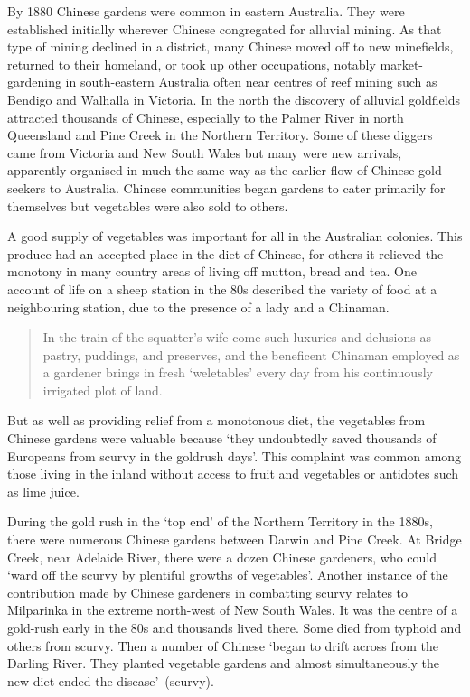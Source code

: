By 1880 Chinese gardens were common in eastern Australia.  They were
established initially wherever Chinese congregated for alluvial
mining.  As that type of mining declined in a
district, many Chinese moved off to new minefields, returned to their
homeland, or took up other occupations, notably market-gardening in
south-eastern Australia often near centres of reef mining
 such as Bendigo  and Walhalla
 in Victoria.  In the north the discovery of alluvial
goldfields attracted thousands of Chinese, especially to the Palmer
River in
 north
Queensland  and Pine Creek  in the
Northern Territory.   Some of these diggers
came from Victoria and New South Wales but many were new arrivals,
apparently organised in much the same way as the earlier flow of
Chinese gold-seekers to Australia.  Chinese communities began gardens
to cater primarily for themselves but vegetables were also sold to
others.

A good supply of vegetables was important for all in the Australian
colonies.  This produce had an accepted place in the diet of Chinese,
for others it relieved the monotony in many country areas of living
off mutton, bread and tea.  One account of life on a sheep station in
the 80s described the variety of food at a neighbouring station, due
to the presence of a lady and a Chinaman.
\begin{quote}
	In the train of the squatter's wife come such luxuries and
	delusions as pastry, puddings, and preserves, and the
	beneficent Chinaman employed as a gardener brings in fresh
	`weletables' every day from his continuously irrigated plot of
	land.
\end{quote}
But as well as providing relief from a monotonous diet, the vegetables
from Chinese gardens were valuable because `they undoubtedly saved
thousands of Europeans from scurvy in the goldrush
days'.  This complaint was common among those living in
the inland without access to fruit and vegetables or antidotes such as
lime juice.

During the gold rush in the `top end' of the Northern Territory
 in the
1880s, there were numerous Chinese  gardens between Darwin
 and Pine Creek.  At Bridge Creek,
near Adelaide River,  there were a dozen Chinese
gardeners, who could `ward off the scurvy by plentiful growths of
vegetables'.  Another instance of the contribution made by Chinese
gardeners in combatting scurvy relates to Milparinka
 in the extreme north-west of New South Wales.  It
was the centre of a gold-rush early in the 80s and thousands lived
there.  Some died from typhoid and others from scurvy.  Then a number
of Chinese `began to drift across from the Darling River. They planted
vegetable gardens and almost simultaneously the new diet ended the
disease'~(scurvy).

